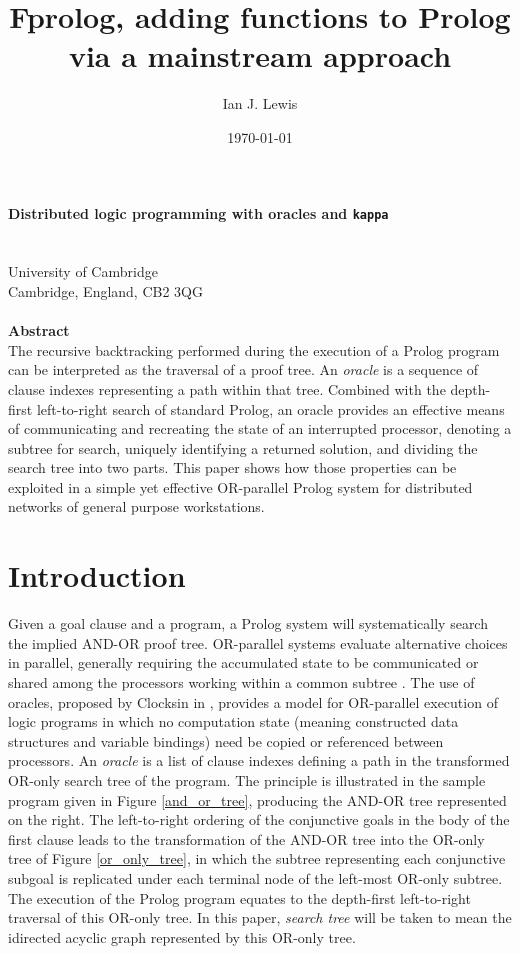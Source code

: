 \documentclass[a4paper,11pt,twoside]{article}
\author{Ian J. Lewis}
\date{\today}
\title{Fprolog, adding functions to Prolog via a mainstream approach}
\begin{document}
\huge
\noindent
{\bf Distributed logic programming with oracles and \texttt{kappa}}
\normalsize
\\
\\
\large
{}\\
University of Cambridge\\
Cambridge, England, CB2 3QG\\
\\

\Large
\noindent
{\bf Abstract}
\normalsize
\\

\noindent
The recursive backtracking performed during the execution of a Prolog program can
be interpreted as the traversal of a proof tree.  An \textit{oracle} is a sequence
of clause indexes representing a path within that tree.  Combined with the depth-first
left-to-right search of standard Prolog, an oracle provides an effective means of
communicating and recreating
the state of an interrupted processor, denoting a subtree for search, uniquely
identifying a returned solution, and dividing the search tree into two parts.  This
paper shows how those properties can be exploited in a simple yet effective OR-parallel
Prolog system for distributed networks of general purpose workstations.

\section{Introduction} %

Given a goal clause and a program, a Prolog system will systematically
search the implied AND-OR
proof tree.  OR-parallel systems evaluate alternative choices in parallel, generally
requiring the accumulated state to be communicated or shared among the processors
working within a common subtree \cite{Ali87, B+92, Clo92, DLO87, LWH+90, War87}.
The use of oracles, proposed by Clocksin in \cite{Clo87}, provides a model for
OR-parallel execution of logic programs in which no computation state (meaning
constructed data structures and variable bindings) need be copied or referenced between
processors.  An \textit{oracle} is a list of clause indexes defining a path in
the transformed OR-only search tree of the program.  The principle is illustrated
in the sample program given in Figure \ref{and_or_tree}, producing the
AND-OR tree represented on the right.
The left-to-right
ordering of the conjunctive goals in the body of the first clause leads to the
transformation of the AND-OR tree into the OR-only tree of Figure \ref{or_only_tree},
in which the subtree representing each conjunctive subgoal is replicated under each
terminal node of the left-most OR-only subtree.  The execution of the Prolog
program equates to the depth-first left-to-right traversal of this OR-only tree.
In this paper, \textit{search tree} will be taken to mean the
idirected acyclic graph represented by this OR-only tree.
\end{document}
